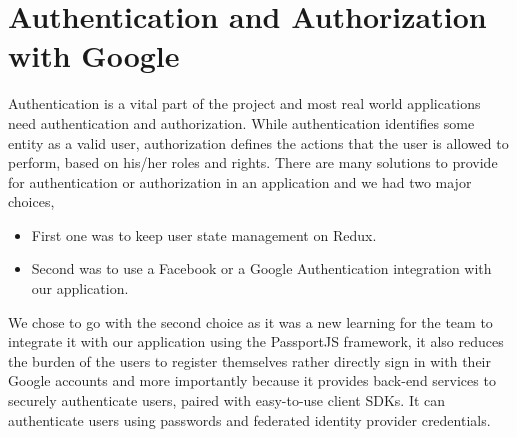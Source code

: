 \section{Authentication and Authorization with Google}

Authentication is a vital part of the project and most real world applications need authentication and authorization. While authentication identifies some entity as a valid user, authorization defines the actions that the user is allowed to perform, based on his/her roles and rights. There are many solutions to provide for authentication or authorization in an application and we had two major choices,

\begin{itemize}
\item First one was to keep user state management on Redux.
\item Second was to use a Facebook or a Google Authentication integration with our application.
\end{itemize}

We chose to go with the second choice as it was a new learning for the team to integrate it with our application using the PassportJS framework, it also reduces the burden of the users to register themselves rather directly sign in with their Google accounts and more importantly because it provides back-end services to securely authenticate users, paired with easy-to-use client SDKs. It can authenticate users using passwords and federated identity provider credentials.  

